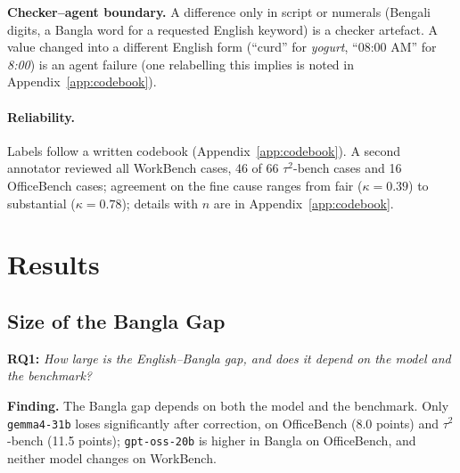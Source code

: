 \documentclass[11pt]{article}
\newcommand{\gemma}{\texttt{gemma4-31b}}
\newcommand{\gptoss}{\texttt{gpt-oss-20b}}
\newcommand{\OB}{OfficeBench}
\newcommand{\WB}{WorkBench}
\newcommand{\TAU}{$\tau^2$-bench}
\begin{document}
\noindent \textbf{Checker--agent boundary.} A difference only in script or numerals (Bengali
digits, a Bangla word for a requested English keyword) is a checker artefact. A value changed into a
different English form (``curd'' for \emph{yogurt}, ``08:00 AM'' for \emph{8:00}) is an agent
failure (one relabelling this implies is noted in Appendix~\ref{app:codebook}).

\paragraph{Reliability.} Labels follow a written codebook (Appendix~\ref{app:codebook}). A
second annotator reviewed all \WB{} cases, 46 of 66 \TAU{} cases and 16 \OB{} cases; agreement on
the fine cause ranges from fair ($\kappa=0.39$) to substantial ($\kappa=0.78$); details with $n$ are
in Appendix~\ref{app:codebook}.

\section{Results}

\subsection{Size of the Bangla Gap}
\label{sec:rq1}

\noindent\textbf{RQ1:} \emph{How large is the English--Bangla gap, and does it depend on the model and the benchmark?}

\noindent\textbf{Finding.} The Bangla gap depends on both the model and the benchmark. Only
\gemma{} loses significantly after correction, on \OB{} (8.0 points) and \TAU{} (11.5 points);
\gptoss{} is higher in Bangla on \OB{}, and neither model changes on \WB{}.
\end{document}
